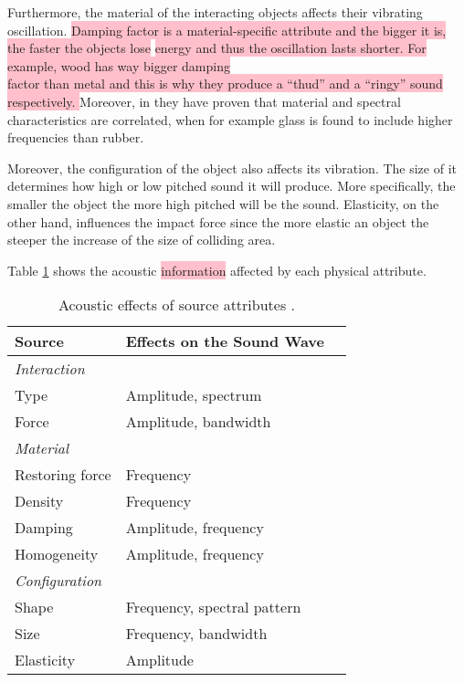 Furthermore, the material of the interacting objects affects their vibrating oscillation. \colorbox{pink}{Damping factor is a material-specific attribute and the bigger it is, the faster the objects lose} \colorbox{pink}{energy and thus the oscillation lasts shorter. For example, wood has way bigger damping}\\ \colorbox{pink}{factor than metal and this is why they produce a ``thud'' and a ``ringy'' sound respectively. } Moreover, in \cite{klatzky2000perception} they have proven that material and spectral characteristics are correlated, when for example glass is found to include higher frequencies than rubber. 

Moreover, the configuration of the object also affects its vibration. The size of it determines how high or low pitched sound it will produce. More specifically, the smaller the object the more high pitched will be the sound. Elasticity, on the other hand, influences the impact force since the more elastic an object the steeper the increase of the size of colliding area.  

Table \ref{tab:acoustic_effects} shows the acoustic \colorbox{pink}{information} affected by each physical attribute. 

\begin{table}[H]
	\centering
    \begin{tabular}{ | l | l | p{5cm} |}
    \hline
    \textbf{Source} & \textbf{Effects on the Sound Wave} \\ \hline
    \emph{Interaction} &  \\ 
    \hspace{8pt} Type & Amplitude, spectrum \\ 
    \hspace{8pt} Force & Amplitude, bandwidth \\
    \hline
    \emph{Material} &  \\ 
    \hspace{8pt} Restoring force & Frequency \\ 
    \hspace{8pt} Density & Frequency \\
    \hspace{8pt} Damping & Amplitude, frequency \\
    \hspace{8pt} Homogeneity & Amplitude, frequency \\
    \hline
    \emph{Configuration} &  \\ 
    \hspace{8pt} Shape & Frequency, spectral pattern \\ 
    \hspace{8pt} Size & Frequency, bandwidth \\
    \hspace{8pt} Elasticity & Amplitude \\
    \hline
    \end{tabular}
    \caption{Acoustic effects of source attributes \cite{gaver1993world}.}
    \label{tab:acoustic_effects}
\end{table}

